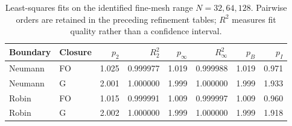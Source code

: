 \begin{table}[htbp]
\centering
\footnotesize
\setlength{\tabcolsep}{4pt}
\begin{tabular}{llrrrrrr}
\toprule
Boundary & Closure & $p_2$ & $R_2^2$ & $p_\infty$ & $R_\infty^2$ & $p_B$ & $p_I$ \\
\midrule
Neumann & FO & 1.025 & 0.999977 & 1.019 & 0.999988 & 1.019 & 0.971 \\
Neumann & G & 2.001 & 1.000000 & 1.999 & 1.000000 & 1.999 & 1.933 \\
Robin & FO & 1.015 & 0.999991 & 1.009 & 0.999997 & 1.009 & 0.960 \\
Robin & G & 2.002 & 1.000000 & 1.999 & 1.000000 & 1.999 & 1.918 \\
\bottomrule
\end{tabular}
\caption{Least-squares fits on the identified fine-mesh range $N=32,64,128$. Pairwise orders are retained in the preceding refinement tables; $R^2$ measures fit quality rather than a confidence interval.}
\label{tab:fitted-global}
\end{table}
